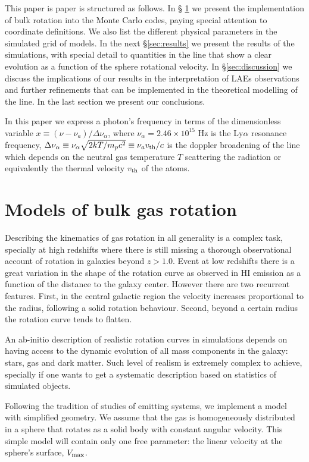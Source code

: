 \documentclass{emulateapj}
\newcommand{\ly}{{\ifmmode{{\rm Ly}\alpha~}\else{Ly$\alpha$~}\fi}}
\begin{document}
 
This paper is paper is structured as follows. In \S
\ref{sec:implementation} we present the implementation of bulk
rotation into the Monte Carlo codes, paying special attention to coordinate
definitions. We also list the different physical parameters in
the simulated grid of models. In the next \S \ref{sec:results} we present the
results of the simulations, with special detail to quantities in the
line that show a clear evolution as a function of the sphere
rotational velocity. In \S \ref{sec:discussion} we discuss the
implications of our results in the interpretation of LAEs
observations and further refinements that can be implemented in the
theoretical modelling of the \ly line. In the last section we present
our conclusions. 

In this paper we express a photon's frequency in terms of the
dimensionless variable $x\equiv (\nu -\nu_a)/\Delta\nu_\alpha$, where
$\nu_{\alpha}=2.46\times 10^{15}$ Hz is the Ly$\alpha$ resonance
frequency,  $\Delta\nu_{\alpha} \equiv
\nu_{\alpha}\sqrt{2kT/m_pc^2}\equiv \nu_av_{\rm th}/c $ is the doppler
broadening of the line which depends on the neutral gas temperature
$T$ scattering the radiation or equivalently the thermal velocity
$v_{\rm th}$ of the atoms. 


\section{Models of bulk gas rotation}
\label{sec:implementation}

Describing the kinematics of gas rotation in all generality is a
complex task, specially at high redshifts where there is still missing
a thorough observational account of rotation in galaxies beyond
$z>1.0$. Event at low redshifts there is a great
variation in the shape of the rotation curve as observed in HI
emission as a function of the distance to the galaxy center. However
there are two recurrent features. First, in the
central galactic region the velocity increases proportional to the radius,
following a solid rotation behaviour. Second, beyond a certain radius
the rotation curve tends to flatten.  

An ab-initio description of realistic rotation curves in simulations
depends on having access to the dynamic evolution of all mass components
in the galaxy: stars, gas and dark matter. Such level of realism is
extremely complex to achieve, specially if one wants to get a
systematic description based on statistics of simulated objects.

Following the tradition of studies of \ly emitting systems,
we implement a model with simplified geometry. We assume that the gas
is homogeneously distributed in a sphere that rotates as a solid body
with constant angular velocity. This simple model will contain only
one free parameter: the linear velocity at the sphere's surface, $V_{\rm
  max}$. 
\end{document}
